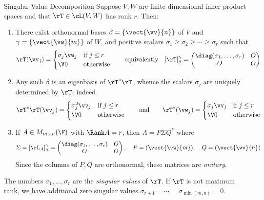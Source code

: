 \begin{thm}{Singular Value Decomposition}{}
Suppose $V,W$ are finite-dimensional inner product spaces and that $\rT\in\cL(V,W)$ has rank $r$. Then:

\begin{enumerate}
  \item There exist orthonormal bases $\beta=\{\vect{\vv}{n}\}$ of $V$ and $\gamma=\{\vect{\vw}{m}\}$ of $W$, and positive scalars $\sigma_1\ge\sigma_2\ge\cdots\ge \sigma_r$ such that
\[\rT(\vv_j)=\begin{cases}
	\sigma_j\vw_j&\text{if }j\le r\\
	\V0&\text{otherwise}
	\end{cases}
	\qquad\text{equivalently}\quad [\rT]_\beta^\gamma=\begin{pmatrix}
	\diag(\sigma_1,\ldots,\sigma_r)&O\\
	O&O
	\end{pmatrix}\]
	\item Any such $\beta$ is an eigenbasis of $\rT^*\rT$, whence the scalars $\sigma_j$ are uniquely determined by $\rT$: indeed
  \[\rT^*\rT(\vv_j)=\begin{cases}
  \sigma_j^2\vv_j&\text{if }j\le r\\
  \V0&\text{otherwise}
  \end{cases}
  \qquad\text{and}\qquad
  \rT^*(\vw_j)=\begin{cases}
  \sigma_j\vv_j&\text{if }j\le r\\
  \V0&\text{otherwise}
  \end{cases}\]
  
	\item If $A\in M_{m\times n}(\F)$ with $\Rank A=r$, then $A=P\Sigma Q^*$ where
  \[\Sigma=[\rL_A]_\beta^\gamma=\begin{pmatrix}
	\diag(\sigma_1,\ldots,\sigma_r)&O\\
	O&O
	\end{pmatrix},\quad P=(\vect{\vw}{m}),\quad Q=(\vect{\vv}{n})\]
	Since the columns of $P,Q$ are orthonormal, these matrices are \emph{unitary.}
\end{enumerate}
\end{thm}

\goodbreak

\begin{defn}{}{}
The numbers $\sigma_1,\ldots,\sigma_r$ are the \emph{singular values} of $\rT$. If $\rT$ is not maximum rank, we have additional zero singular values $\sigma_{r+1}=\cdots=\sigma_{\min(m,n)}=0$.
\end{defn}



